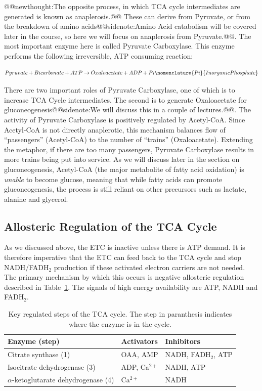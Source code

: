 \documentclass{tufte-handout}
\makeatletter
\def\newthought#1{@@newthought:#1@@}
\def\sidenote#1{@@sidenote:#1@@}
\makeatother
\begin{document}
\newthought{The opposite process, in which TCA cycle intermediates are generated is known as anaplerosis.}  These can derive from Pyruvate, or from the breakdown of amino acids\sidenote{Amino Acid catabolism will be covered later in the course, so here we will focus on anaplerosis from Pyruvate.}.  The most important enzyme here is called Pyruvate Carboxylase.  This enzyme performs the following irreversible, ATP consuming reaction:

\begin{equation}\label{eq:pcx}
Pyruvate + Bicarbonate + ATP \rightarrow Oxaloacetate + ADP + Pi\nomenclature{Pi}{Inorganic Phosphate}
\end{equation}

There are two important roles of Pyruvate Carboxylase, one of which is to increase TCA Cycle intermediates.  The second is to generate Oxaloacetate for gluconeogenesis\sidenote{We will discuss this in a couple of lectures.}.  The activity of Pyruvate Carboxylase is positively regulated by Acetyl-CoA.  Since Acetyl-CoA is not directly anaplerotic, this mechanism balances flow of ``passengers'' (Acetyl-CoA) to the number of ``trains'' (Oxaloacetate).  Extending the metaphor, if there are too many passengers, Pyruvate Carboxylase results in more trains being put into service.  As we will discuss later in the section on gluconeogenesis, Acetyl-CoA (the major metabolite of fatty acid oxidation) is \emph{unable} to become glucose, meaning that while fatty acids can promote gluconeogenesis, the process is still reliant on other precursors such as lactate, alanine and glycerol.

\subsection{Allosteric Regulation of the TCA Cycle}

As we discussed above, the ETC is inactive unless there is ATP demand.  It is therefore imperative that the ETC can feed back to the TCA cycle and stop NADH/FADH$_2$ production if these activated electron carriers are not needed.  The primary mechanism by which this occurs is negative allosteric regulation described in Table~\ref{tab:tca-allosteric}.  The signals of high energy availability are ATP, NADH and FADH$_2$.

\begin{table}
\centering
\caption{Key regulated steps of the TCA cycle.  The step in paranthesis indicates where the enzyme is in the cycle.}\label{tab:tca-allosteric}
\begin{tabular}{lll}
\hline
\textbf {Enzyme (step)} & \textbf{Activators} & \textbf{Inhibitors}\\
\hline
Citrate synthase (1) & OAA\nomenclature{OAA}{Oxaloacetate}, AMP\nomenclature{AMP}{Adenosine Monophosphate} & NADH, FADH$_2$, ATP\\
Isocitrate dehydrogenase (3) & ADP, Ca$^{2+}$ &  NADH, ATP\\
$\alpha$-ketoglutarate dehydrogenase (4) & Ca$^{2+}$ &  NADH\\
\hline
\end{tabular}
\end{table}
\end{document}
